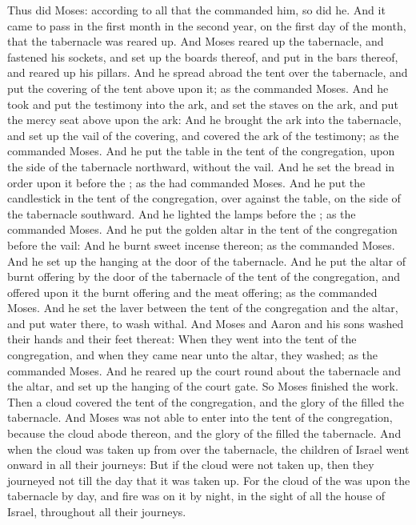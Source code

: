 \begin{biblechapter}
\verse Thus did Moses: according to all that the \LORD commanded him, so did he.
\verse And it came to pass in the first month in the second year, on the first day of the month, that the tabernacle was reared up.
\verse And Moses reared up the tabernacle, and fastened his sockets, and set up the boards thereof, and put in the bars thereof, and reared up his pillars.
\verse And he spread abroad the tent over the tabernacle, and put the covering of the tent above upon it; as the \LORD commanded Moses.
\verse And he took and put the testimony into the ark, and set the staves on the ark, and put the mercy seat above upon the ark:
\verse And he brought the ark into the tabernacle, and set up the vail of the covering, and covered the ark of the testimony; as the \LORD commanded Moses.
\verse And he put the table in the tent of the congregation, upon the side of the tabernacle northward, without the vail.
\verse And he set the bread in order upon it before the \LORD; as the \LORD had commanded Moses.
\verse And he put the candlestick in the tent of the congregation, over against the table, on the side of the tabernacle southward.
\verse And he lighted the lamps before the \LORD; as the \LORD commanded Moses.
\verse And he put the golden altar in the tent of the congregation before the vail:
\verse And he burnt sweet incense thereon; as the \LORD commanded Moses.
\verse And he set up the hanging at the door of the tabernacle.
\verse And he put the altar of burnt offering by the door of the tabernacle of the tent of the congregation, and offered upon it the burnt offering and the meat offering; as the \LORD commanded Moses.
\verse And he set the laver between the tent of the congregation and the altar, and put water there, to wash withal.
\verse And Moses and Aaron and his sons washed their hands and their feet thereat:
\verse When they went into the tent of the congregation, and when they came near unto the altar, they washed; as the \LORD commanded Moses.
\verse And he reared up the court round about the tabernacle and the altar, and set up the hanging of the court gate. So Moses finished the work.
 Then a cloud covered the tent of the congregation, and the glory of the \LORD filled the tabernacle.
\verse And Moses was not able to enter into the tent of the congregation, because the cloud abode thereon, and the glory of the \LORD filled the tabernacle.
\verse And when the cloud was taken up from over the tabernacle, the children of Israel went onward in all their journeys:
\verse But if the cloud were not taken up, then they journeyed not till the day that it was taken up.
\verse For the cloud of the \LORD was upon the tabernacle by day, and fire was on it by night, in the sight of all the house of Israel, throughout all their journeys.
\end{biblechapter}
